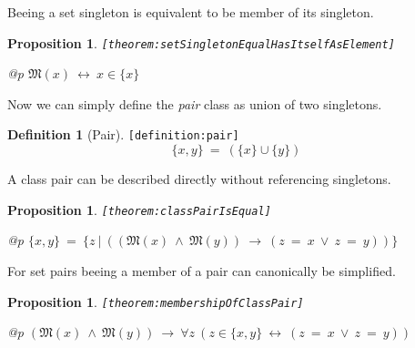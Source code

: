 \documentclass[a4paper,german,10pt,twoside]{book}
\newtheorem{prop}[thm]{Proposition}
\theoremstyle{definition}
\newtheorem{defn}{Definition}
\theoremstyle{remark}
\begin{document}
\par
Beeing a set singleton is equivalent to be member of its singleton.

\begin{prop}
\label{theorem:setSingletonEqualHasItselfAsElement} \hypertarget{theorem:setSingletonEqualHasItselfAsElement}{}
{\tt \tiny [\verb]theorem:setSingletonEqualHasItselfAsElement]]}
\mbox{}
\begin{longtable}{{@{\extracolsep{\fill}}p{\linewidth}}}
\centering $\mathfrak{M}(x)\ \leftrightarrow\ x \in \{ x \}$
\end{longtable}

\end{prop}


\par
Now we can simply define the \emph{pair} class as union of two singletons.

\begin{defn}[Pair]
\label{definition:pair} \hypertarget{definition:pair}{}
{\tt \tiny [\verb]definition:pair]]}
$$\{ x, y \} \ = \ (\{ x \} \cup \{ y \})$$
\end{defn}


\par
A class pair can be described directly without referencing singletons.

\begin{prop}
\label{theorem:classPairIsEqual} \hypertarget{theorem:classPairIsEqual}{}
{\tt \tiny [\verb]theorem:classPairIsEqual]]}
\mbox{}
\begin{longtable}{{@{\extracolsep{\fill}}p{\linewidth}}}
\centering $\{ x, y \} \ = \ \{ z \ | \ ((\mathfrak{M}(x)\ \land\ \mathfrak{M}(y))\ \rightarrow\ (z \ = \ x\ \lor\ z \ = \ y)) \} $
\end{longtable}

\end{prop}


\par
For set pairs beeing a member of a pair can canonically be simplified.

\begin{prop}
\label{theorem:membershipOfClassPair} \hypertarget{theorem:membershipOfClassPair}{}
{\tt \tiny [\verb]theorem:membershipOfClassPair]]}
\mbox{}
\begin{longtable}{{@{\extracolsep{\fill}}p{\linewidth}}}
\centering $(\mathfrak{M}(x)\ \land\ \mathfrak{M}(y))\ \rightarrow\ \forall z\ (z \in \{ x, y \}\ \leftrightarrow\ (z \ = \ x\ \lor\ z \ = \ y))$
\end{longtable}

\end{prop}
\end{document}

